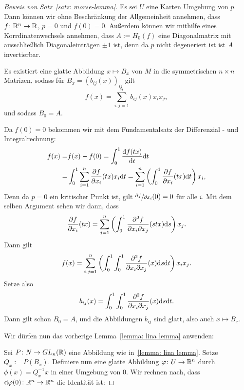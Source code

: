 \begin{proof}[Beweis von Satz~\ref{satz: morse-lemma}]
    Es sei $U$ eine Karten Umgebung von $p$. Dann können wir ohne Beschränkung der 
    Allgemeinheit annehmen, dass $f \colon { \mathbb R }^n \to { \mathbb R }$, $p = 0$ und $f(0) = 0$.
    Außerdem können wir mithilfe eines Korrdinatenwechsels annehmen, dass $A := H_0(f)$
    eine Diagonalmatrix mit ausschließlich Diagonaleinträgen $\pm 1$ ist, denn da $p$
    nicht degeneriert ist ist $A$ invertierbar. 
    \begin{claim*}
        Es existiert eine glatte Abbildung $x \mapsto B_x$ von $M$ in die symmetrischen
        $n \times n$ Matrizen, sodass für $B_x = (b_{ij}(x))_{ij}$ gilt 
        \[ f(x) = \sum_{i, j = 1}^n b_{ij}(x) x_i x_j , \]
        und sodass $B_0 = A$. 
    \end{claim*}
    \begin{smallproof}
        Da $f(0) = 0$ bekommen wir mit dem Fundamentalsatz der 
        Differenzial - und Integralrechnung: 
        \begin{align*}
            f(x) = & f(x) - f(0) 
                = \int_0^1 \derive[f (tx)]{t} \opd t \\
            = & \int_0^1 \sum_{i = 1}^n \pderive[f]{x_i}(tx) x_i \opd t 
                = \sum_{i = 1}^n \left( \int_0^1 \pderive[f]{x_i}(tx) \opd t \right) x_i ,
        \end{align*}
        Denn da $p = 0$ ein kritischer Punkt ist, gilt $\pderive[f]{x_i}(0) = 0$ für alle 
        $i$. Mit dem selben Argument sehen wir dann, dass
        \[ \pderive[f]{x_i}(tx) = 
        \sum_{j = 1}^n \left( \int_0^1 \pdderive[f]{x_i}{x_j}(stx) \opd s \right) x_j . \]
        Dann gilt 
        \[ f(x) = 
            \sum_{i, j = 1}^n 
            \left( \int_0^1 \int_0^1 \pdderive[f]{x_i}{x_j} (x) \opd s \opd t \right) 
            x_i x_j 
        . \]
        Setze also 
        \[ b_{ij}(x) = \int_0^1 \int_0^1 \pdderive[f]{x_i}{x_j} (x) \opd s \opd t . \]
        Dann gilt schon $B_0  = A$, und die Abbildungen $b_{ij}$ sind glatt, also 
        auch $x \mapsto B_ x$.
    \end{smallproof}
    Wir dürfen nun das vorherige Lemma~\ref{lemma: lina lemma} anwenden:

    Sei $P \colon N \to GL_n({ \mathbb R })$ eine Abbildung wie in~\ref{lemma: lina lemma}.
    Setze $Q_x := P(B_x)$. Definiere nun eine glatte Abbildung $\varphi \colon U \to { \mathbb R }^n$
    durch $\phi (x) = Q_x^{-1}x$ in einer Umgebung von $0$. Wir rechnen nach, dass 
    ${ \operatorname{d} } \varphi (0) \colon { \mathbb R }^n \to { \mathbb R }^n$ die Identität ist:


\end{proof}
